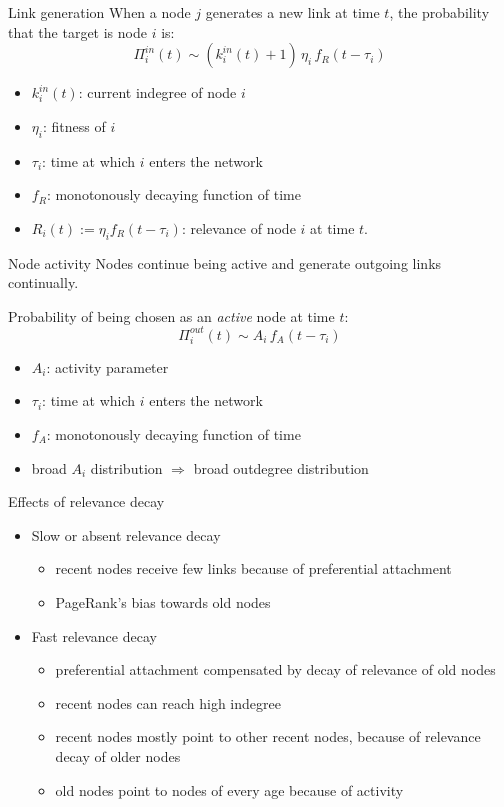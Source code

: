 \documentclass[utf8]{beamer}
\begin{document}
\begin{frame}{Link generation}
    When a node $j$ generates a new link at time $t$, the probability that the target is node $i$ is:
    \[
        \Pi_i^{in}(t) \sim (k_i^{in}(t) + 1) \, \eta_i \, f_R (t-\tau_i)
    \]
    \begin{itemize}
        \item $k_i^{in}(t)$: current indegree of node $i$
        \item $\eta_i$: fitness of $i$
        \item $\tau_i$: time at which $i$ enters the network
        \item $f_R$: monotonously decaying function of time
        \item $R_i(t) := \eta_i f_R (t-\tau_i)$: \alert{relevance} of node $i$ at time $t$.
    \end{itemize}
\end{frame}

\begin{frame}{Node activity}
    Nodes continue being active and generate outgoing links continually.

    Probability of being chosen as an \emph{active} node at time $t$:
    \[
        \Pi_i^{out}(t) \sim A_i \, f_A (t-\tau_i)
    \]
    \begin{itemize}
        \item $A_i$: activity parameter
        \item $\tau_i$: time at which $i$ enters the network
        \item $f_A$: monotonously decaying function of time
        \item broad $A_i$ distribution $\Longrightarrow$ broad outdegree distribution
    \end{itemize}
\end{frame}

\begin{frame}{Effects of relevance decay}
\begin{itemize}
    \item \alert{Slow} or absent relevance decay
    \begin{itemize}
        \item recent nodes receive few links because of preferential attachment
        \item PageRank's bias towards old nodes
    \end{itemize}
    \item \alert{Fast} relevance decay
    \begin{itemize}
        \item preferential attachment compensated by decay of relevance of old nodes
        \item recent nodes can reach high indegree
        \item recent nodes mostly point to other recent nodes, because of relevance decay of older nodes
        \item old nodes point to nodes of every age because of activity
    \end{itemize}
\end{itemize}
\end{frame}
\end{document}
